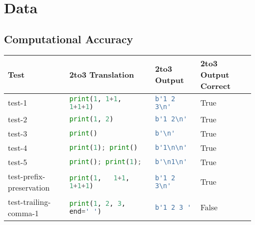 \section{Data}
\label{appendix:Data}
\subsection{Computational Accuracy}

\begin{table}[h!]
    \centering
    \begin{tabular}{@{}l|lll@{}}
    \toprule
    Test                                  & 2to3 Translation                      & 2to3 Output                            & 2to3 Output Correct \\ \midrule
    test-1                               & \lstinline[language=Python, style=pythonstyle]|print(1, 1+1, 1+1+1)                 | & \lstinline[language=Python, style=pythonstyle]|b'1 2 3\n'  |            & True                \\
    test-2                               & \lstinline[language=Python, style=pythonstyle]|print(1, 2)                          | & \lstinline[language=Python, style=pythonstyle]|b'1 2\n'   |             & True                \\
    test-3                               & \lstinline[language=Python, style=pythonstyle]|print()                              | & \lstinline[language=Python, style=pythonstyle]|b'\n'    |               & True                \\
    test-4                               & \lstinline[language=Python, style=pythonstyle]|print(1); print()                    | & \lstinline[language=Python, style=pythonstyle]|b'1\n\n' |& True                \\
    test-5                               & \lstinline[language=Python, style=pythonstyle]|print(); print(1);                   | & \lstinline[language=Python, style=pythonstyle]|b'\n1\n' |& True                \\
    test-prefix-preservation            & \lstinline[language=Python, style=pythonstyle]|print(1,   1+1,   1+1+1)             | & \lstinline[language=Python, style=pythonstyle]|b'1 2 3\n'  |            & True                \\
    test-trailing-comma-1              & \lstinline[language=Python, style=pythonstyle]|print(1, 2, 3, end=' ')              | & \lstinline[language=Python, style=pythonstyle]|b'1 2 3 '   |                           & False               \\

\end{tabular}
\end{table}
